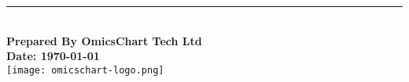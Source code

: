 \vspace{50pt}
\begin{center}
    \rule{\linewidth}{0.5pt} \\  %
    \vspace{10pt}
    \textbf{Prepared By OmicsChart Tech Ltd} \\
    \vspace{10pt}
    \textbf{Date: \today} \\
    \vspace{10pt}
    \texttt{[image: omicschart-logo.png]}
\end{center}
